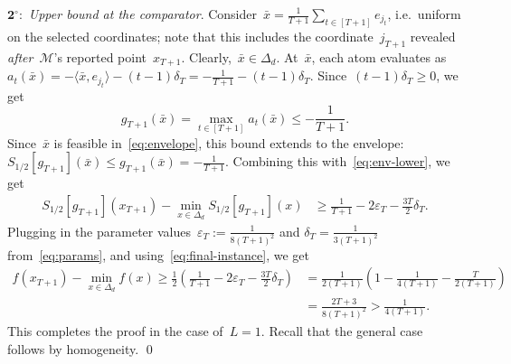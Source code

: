 \documentclass[11pt]{article}
\numberwithin{equation}{section}
\let\le\leqslant
\let\ge\geqslant
\theoremstyle{remark}
\newcommand{\proofstep}[1]{$\textbf{#1}^{\circ}$}
\newcommand{\veps}{\varepsilon}
\newcommand{\Env}{S}
\newcommand{\Ent}{\textup{\textsf{Ent}}}
\newcommand{\Mtd}{\mathscr{M}}
\let\Div\relax\newcommand{\Div}{D_h}
\newcommand{\Fh}{\Ent_d}
\newcommand{\Simp}{\Delta_d}
\newcommand{\1}{\mathbf{1}}
\begin{document}
\proofstep{2}:~{\em Upper bound at the comparator}. 
%
Consider~$\bar x = \frac{1}{T+1} \sum_{t \in [T+1]} e_{j_{t}}$, i.e.~uniform on the selected coordinates; note that this includes the coordinate~$j_{T+1}$ revealed {\em after}~$\Mtd$'s reported point~$x_{T+1}$. 
Clearly,~$\bar x \in \Simp$. 
At~$\bar x$, each atom evaluates as~$a_t(\bar x) = -\langle \bar x, e_{j_t}\rangle-(t-1)\delta_T = -\tfrac1{T+1}-(t-1)\delta_T$. 
Since~$(t-1)\delta_T \ge 0$,  we get
\begin{equation*}
        g_{T+1}(\bar x)
        =
        \max_{t \in [T+1]}  a_t(\bar x)
        \le-\frac1{T+1}.
\end{equation*}
Since~$\bar x$ is feasible in~\eqref{eq:envelope}, this bound extends to the envelope:
$
        \Env_{1/2}[g_{T+1}](\bar x) \le g_{T+1}(\bar x) = -\frac1{T+1}.
$
Combining this with~\eqref{eq:env-lower}, we get 
\begin{align*}
\Env_{1/2}[g_{T+1}](x_{T+1})-\min_{x \in \Simp}\Env_{1/2}[g_{T+1}](x)
&\ge
\frac1{T+1}-2\veps_T-\frac{3T}{2}\delta_T.
\end{align*}
Plugging in the parameter values~$ \veps_T :=\frac{1}{8(T+1)^2}$ and $ \delta_T = \frac{1}{3(T+1)^2} $ from~\eqref{eq:params}, and using~\eqref{eq:final-instance}, we get 
\begin{equation*}
\begin{aligned}
        f(x_{T+1})-\min_{x \in \Simp}f(x)
        \ge
        \frac{1}{2}\left( \frac1{T+1}-2\veps_T-\frac{3T}{2}\delta_T \right)
        &= 
         \frac{1}{2(T+1)}\left(1-\frac{1}{4(T+1)}-\frac{T}{2(T+1)} \right) \\
        &=
         \frac{2T+3}{8(T+1)^2}
         > \frac{1}{4(T+1)}.
\end{aligned}
\end{equation*}
This completes the proof in the case of~$L = 1$. Recall that the general case follows by homogeneity.
%
\qed
\end{document}
